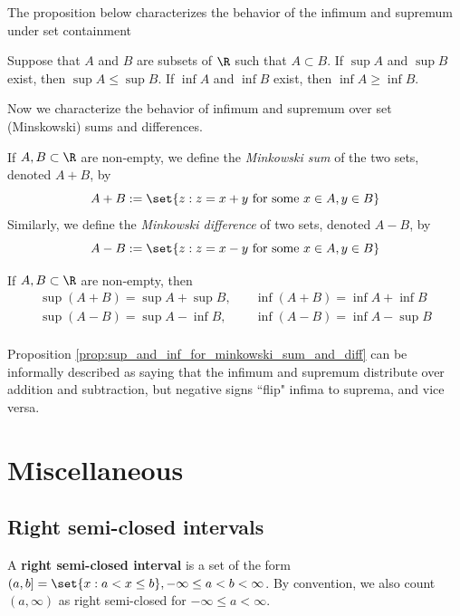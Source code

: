 \documentclass{article} %
\begin{document}
The proposition below characterizes the behavior of the infimum and supremum under set containment

\begin{proposition}
Suppose that $A$ and $B$ are subsets of $\R$ such that $A \subset B$.  If $\sup A$ and $\sup B$ exist, then $\sup A \leq \sup B$.  If $\inf A$ and $\inf B$ exist, then $\inf A \geq \inf B$.
\label{prop:sup_and_inf_for_subsets_are_tighter}
\end{proposition}

Now we characterize the behavior of infimum and supremum over set (Minskowski) sums and differences.

\begin{definition}
If $A, B \subset \R$ are non-empty, we define the \textit{Minkowski sum} of the two sets, denoted $A+B$, by 
\[ A + B := \set{z : z = x + y \text{ for some } x \in A, y \in B } \]
Similarly, we define the \textit{Minkowski difference} of two sets, denoted $A-B$, by
\[ A - B := \set{z : z = x - y \text{ for some } x \in A, y \in B } \]
\label{def:minkowski_sum_and_difference}	
\end{definition}

\begin{proposition}
If $A, B \subset \R$ are non-empty, then 
\begin{align*}
\sup (A+B) = \sup A + \sup B, &\quad \inf (A+B) = \inf A + \inf B 	 \\
\sup (A-B) = \sup A - \inf B, &\quad \inf (A-B) = \inf A - \sup B 	 \\
\end{align*}

\label{prop:sup_and_inf_for_minkowski_sum_and_diff}	
\end{proposition}

\begin{remark}
Proposition \ref{prop:sup_and_inf_for_minkowski_sum_and_diff} can be informally described as saying that the infimum and supremum distribute over addition and subtraction, but negative signs ``flip" infima to suprema, and vice versa. 
\end{remark}


\section{Miscellaneous}
\subsection{Right semi-closed intervals}
\begin{definition}
A \textbf{right semi-closed interval} is a set of the form $(a,b] = \set{x : a < x \leq b}, -\infty \leq a < b < \infty$.  By convention, we also count $(a,\infty)$ as right semi-closed for $-\infty \leq a < \infty$. 
\label{def:rsc_intervals}
\end{definition}
\end{document}
